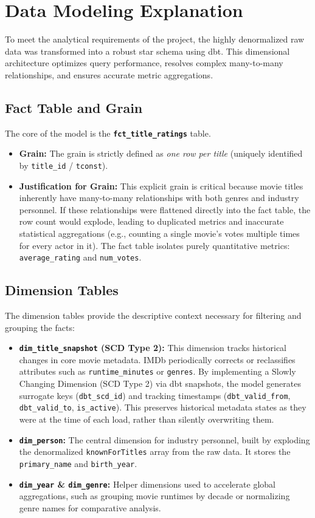\documentclass[runningheads]{llncs}
\begin{document}
\section{Data Modeling Explanation}
To meet the analytical requirements of the project, the highly denormalized raw data was transformed into a robust star schema using dbt. This dimensional architecture optimizes query performance, resolves complex many-to-many relationships, and ensures accurate metric aggregations.

\subsection{Fact Table and Grain}
The core of the model is the \textbf{\texttt{fct\_title\_ratings}} table.
\begin{itemize}
    \item \textbf{Grain:} The grain is strictly defined as \textit{one row per title} (uniquely identified by \texttt{title\_id} / \texttt{tconst}).
    \item \textbf{Justification for Grain:} This explicit grain is critical because movie titles inherently have many-to-many relationships with both genres and industry personnel. If these relationships were flattened directly into the fact table, the row count would explode, leading to duplicated metrics and inaccurate statistical aggregations (e.g., counting a single movie's votes multiple times for every actor in it). The fact table isolates purely quantitative metrics: \texttt{average\_rating} and \texttt{num\_votes}.
\end{itemize}

\subsection{Dimension Tables}
The dimension tables provide the descriptive context necessary for filtering and grouping the facts:
\begin{itemize}
    \item \textbf{\texttt{dim\_title\_snapshot} (SCD Type 2):} This dimension tracks historical changes in core movie metadata. IMDb periodically corrects or reclassifies attributes such as \texttt{runtime\_minutes} or \texttt{genres}. By implementing a Slowly Changing Dimension (SCD Type 2) via dbt snapshots, the model generates surrogate keys (\texttt{dbt\_scd\_id}) and tracking timestamps (\texttt{dbt\_valid\_from}, \texttt{dbt\_valid\_to}, \texttt{is\_active}). This preserves historical metadata states as they were at the time of each load, rather than silently overwriting them.
    \item \textbf{\texttt{dim\_person}:} The central dimension for industry personnel, built by exploding the denormalized \texttt{knownForTitles} array from the raw data. It stores the \texttt{primary\_name} and \texttt{birth\_year}.
    \item \textbf{\texttt{dim\_year} \& \texttt{dim\_genre}:} Helper dimensions used to accelerate global aggregations, such as grouping movie runtimes by decade or normalizing genre names for comparative analysis.
\end{itemize}
\end{document}
